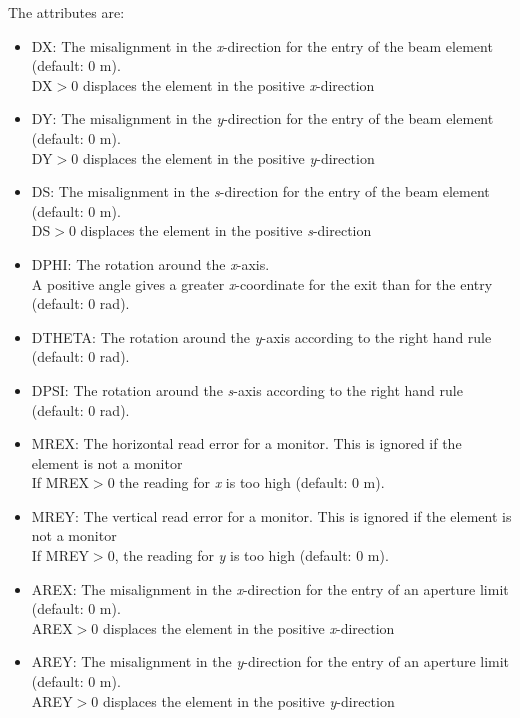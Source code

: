 The attributes are: 
\begin{itemize}
\item DX: The misalignment in the \textit{x}-direction for the entry of the beam element (default: 0 m). 
\\ DX$>$0 displaces the element in the positive \textit{x}-direction 

\item DY: The misalignment in the \textit{y}-direction for the entry of the beam element (default: 0 m). 
\\ DY$>$0 displaces the element in the positive \textit{y}-direction 

\item DS: The misalignment in the \textit{s}-direction for the entry of the beam element (default: 0 m). 
\\ DS$>$0 displaces the element in the positive \textit{s}-direction 

\item DPHI: The rotation around the \textit{x}-axis. 
\\ A positive angle gives a greater \textit{x}-coordinate for the exit than for the entry (default: 0 rad). 

\item DTHETA: The rotation around the \textit{y}-axis according to the right hand rule (default: 0 rad). 

\item DPSI: The rotation around the \textit{s}-axis according to the right hand rule (default: 0 rad). 

\item MREX: The horizontal read error for a monitor. This is ignored if the element is not a monitor 
\\ If MREX$>$0 the reading for \textit{x} is too high (default: 0 m). 

\item MREY: The vertical read error for a monitor. This is ignored if the element is not a monitor 
\\ If MREY$>$0, the reading for \textit{y} is too high (default: 0 m). 

\item AREX: The misalignment in the \textit{x}-direction for the entry of an aperture limit (default: 0 m). 
\\ AREX$>$0 displaces the element in the positive \textit{x}-direction 

\item AREY: The misalignment in the \textit{y}-direction for the entry of an aperture limit (default: 0 m). 
\\ AREY$>$0 displaces the element in the positive \textit{y}-direction 


\end{itemize}
